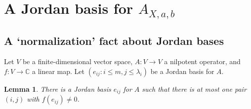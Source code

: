 \documentclass[12pt,psamsfonts]{article}
\newtheorem{lemma}[theorem]{Lemma}
\begin{document}
\section{A Jordan basis for \(A_{X, a, b}\)}

\subsection{A `normalization' fact about Jordan bases}
Let \(V\) be a finite-dimensional vector space, \(A : V \to V\) a nilpotent operator, and \(f : V \to \mathbb{C}\) a linear map.
Let \((e_{ij} : i \leq m, j \leq \lambda_i)\) be a Jordan basis for \(A\).

\begin{lemma}
    There is a Jordan basis \(e_{ij}\) for \(A\) such that there is at most one pair \((i, j)\) with \(f(e_{ij}) \neq 0\).
\end{lemma}
\end{document}
